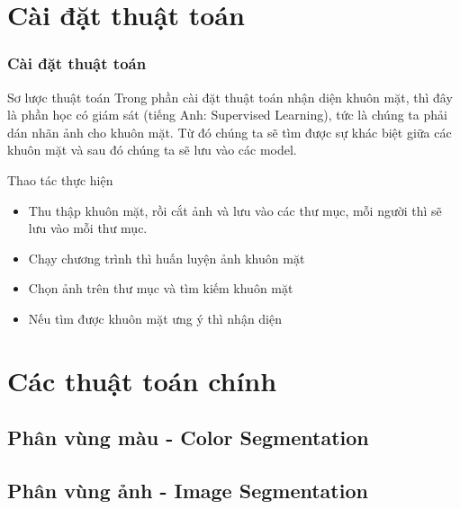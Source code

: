 \documentclass[10.5pt]{beamer}
\begin{document}
\section{\fontsize{8.5pt}{9.5pt}\selectfont Cài đặt thuật toán}
\begin{frame}
	\frametitle{\fontsize{11.5pt}{12.5pt}\selectfont Cài đặt thuật toán}
		\begin{block}{\fontsize{10pt}{12.5pt}\selectfont Sơ lược thuật toán}
			\fontsize{7.5pt}{10.5pt}\selectfont Trong phần cài đặt thuật toán nhận diện khuôn mặt, thì đây là phần học có giám sát (tiếng Anh: Supervised Learning), tức là chúng ta phải dán nhãn ảnh cho khuôn mặt. Từ đó chúng ta sẽ tìm được sự khác biệt giữa các khuôn mặt và sau đó chúng ta sẽ lưu vào các model.
		\end{block}
		\begin{block}{\fontsize{10pt}{10.5pt}\selectfont Thao tác thực hiện}
			\begin{itemize}
				\fontsize{7.5pt}{10.5pt}\selectfont
				\item Thu thập khuôn mặt, rồi cắt ảnh và lưu vào các thư mục, mỗi người thì sẽ lưu vào mỗi thư mục.
				\item Chạy chương trình thì huấn luyện ảnh khuôn mặt
				\item Chọn ảnh trên thư mục và tìm kiếm khuôn mặt
				\item Nếu tìm được khuôn mặt ưng ý thì nhận diện
			\end{itemize}
		\end{block}
\end{frame}

\section{\fontsize{8.5pt}{9.5pt}\selectfont Các thuật toán chính}
\subsection{\fontsize{8.5pt}{9.5pt}\selectfont Phân vùng màu - Color Segmentation}
\subsection{\fontsize{8.5pt}{9.5pt}\selectfont Phân vùng ảnh - Image Segmentation}
\end{document}
